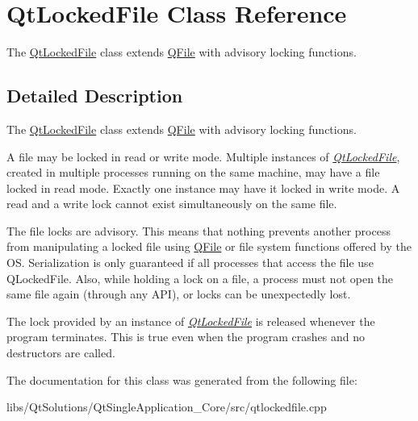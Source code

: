 \hypertarget{class_qt_locked_file}{}\section{Qt\+Locked\+File Class Reference}
\label{class_qt_locked_file}


The \hyperlink{class_qt_locked_file}{Qt\+Locked\+File} class extends \hyperlink{class_q_file}{Q\+File} with advisory locking functions.  




\subsection{Detailed Description}
The \hyperlink{class_qt_locked_file}{Qt\+Locked\+File} class extends \hyperlink{class_q_file}{Q\+File} with advisory locking functions. 

A file may be locked in read or write mode. Multiple instances of {\itshape \hyperlink{class_qt_locked_file}{Qt\+Locked\+File}}, created in multiple processes running on the same machine, may have a file locked in read mode. Exactly one instance may have it locked in write mode. A read and a write lock cannot exist simultaneously on the same file.

The file locks are advisory. This means that nothing prevents another process from manipulating a locked file using \hyperlink{class_q_file}{Q\+File} or file system functions offered by the OS. Serialization is only guaranteed if all processes that access the file use Q\+Locked\+File. Also, while holding a lock on a file, a process must not open the same file again (through any A\+PI), or locks can be unexpectedly lost.

The lock provided by an instance of {\itshape \hyperlink{class_qt_locked_file}{Qt\+Locked\+File}} is released whenever the program terminates. This is true even when the program crashes and no destructors are called. 

The documentation for this class was generated from the following file\+:\begin{DoxyCompactItemize}
\item 
libs/\+Qt\+Solutions/\+Qt\+Single\+Application\+\_\+\+Core/src/qtlockedfile.\+cpp\end{DoxyCompactItemize}
